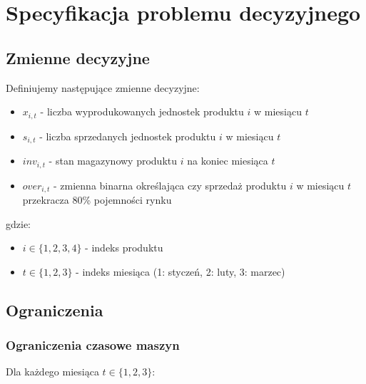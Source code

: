 \documentclass[12pt]{article}
\begin{document}
\section{Specyfikacja problemu decyzyjnego}

\subsection{Zmienne decyzyjne}

Definiujemy następujące zmienne decyzyjne:
\begin{itemize}
  \item $x_{i,t}$ - liczba wyprodukowanych jednostek produktu $i$ w miesiącu $t$
  \item $s_{i,t}$ - liczba sprzedanych jednostek produktu $i$ w miesiącu $t$
  \item $inv_{i,t}$ - stan magazynowy produktu $i$ na koniec miesiąca $t$
  \item $over_{i,t}$ - zmienna binarna określająca czy sprzedaż produktu $i$ w miesiącu $t$ przekracza 80\% pojemności rynku
\end{itemize}

gdzie:
\begin{itemize}
  \item $i \in \{1,2,3,4\}$ - indeks produktu
  \item $t \in \{1,2,3\}$ - indeks miesiąca (1: styczeń, 2: luty, 3: marzec)
\end{itemize}

\subsection{Ograniczenia}

\subsubsection{Ograniczenia czasowe maszyn}

Dla każdego miesiąca $t \in \{1,2,3\}$:
\end{document}
